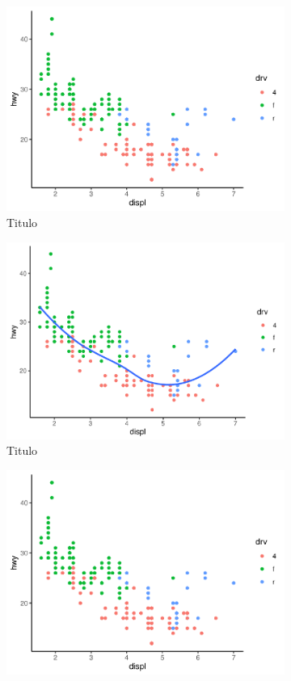 \begin{figure}[!h]
	\begin{subfigure}{\linewidth}
		\caption{Titulo}\label{fig:figcap2}
		\includegraphics{fig/plot}
	\end{subfigure}
	\begin{subfigure}{\linewidth}
		\caption{Titulo}
		\includegraphics{fig/plot2}
	\end{subfigure}
	\begin{subfigure}{\linewidth}
		\includegraphics{fig/plot}

\end{subfigure}
\end{figure}
